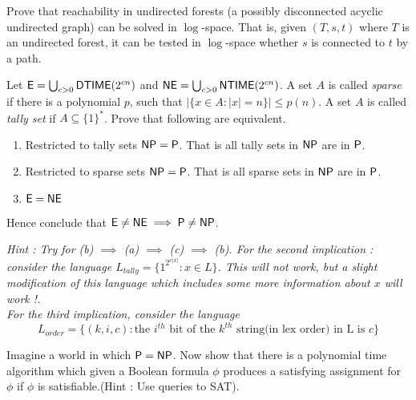 \documentclass[addpoints,12pt]{exam}
\begin{document}
\begin{questions}

\question[10] Prove that reachability in undirected forests (a possibly disconnected acyclic undirected graph) can be solved in $\log$-space. That is, given $(T,s,t)$ where $T$ is an undirected forest, it can be tested in $\log$-space whether $s$ is connected to $t$ by a path.

\question[18]
Let $\E = \bigcup_{c > 0} \DTIME(2^{cn})$ and $\NE = \bigcup_{c > 0} \NTIME(2^{cn})$. A set $A$ is called {\em sparse} if there is a polynomial $p$,
    such that $|\{ x \in A : |x| = n \}| \le p(n)$. A set $A$ is called
    {\em tally set} if $A \subseteq \{1\}^*$.  Prove that following
    are equivalent.
  \begin{enumerate}
  \item Restricted to tally sets $\NP = \P$. That is all tally sets in $\NP$ are in $\P$.
  \item Restricted to sparse sets $\NP = \P$. That is all sparse sets
    in $\NP$ are in $\P$.
  \item $\E = \NE$
  \end{enumerate}
  Hence conclude that $\E \ne \NE \implies \P \ne \NP$.
  
  \emph{Hint : Try for (b) $\implies$ (a) $\implies$ (c) $\implies$ (b). 
  For the second implication : consider the language $L_{tally} = \{1^{2^{c|x|}} : x \in L\}$.
  This will not work, but a slight modification of this language which includes some more information about 
  $x$ will work !. \\ For the third implication, consider the language 
\[ L_{order} = \{(k,i,c): \textrm{the $i^{th}$ bit of the $k^{th}$ string(in lex order) in L is $c$} \} \] }

\question[7] 
Imagine a world in which $\P = \NP$. Now show that there is a
polynomial time algorithm which given a Boolean formula $\phi$ produces a satisfying assignment for $\phi$ if $\phi$ is satisfiable.(Hint : Use queries to SAT).

\end{questions}
\end{document}
